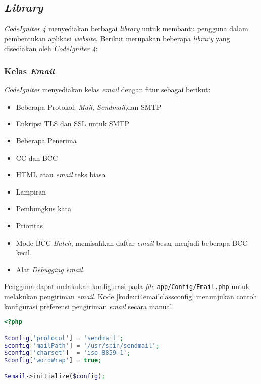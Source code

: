 \subsection{\textit{Library}}
\textit{CodeIgniter 4} menyediakan berbagai \textit{library} untuk membantu pengguna dalam pembentukan aplikasi \textit{website}. Berikut merupakan beberapa \textit{library} yang disediakan oleh \textit{CodeIgniter 4}:
\subsubsection{Kelas \textit{Email}}
\textit{CodeIgniter} menyediakan kelas \textit{email} dengan fitur sebagai berikut:
\begin{itemize}
\item Beberapa Protokol: \textit{Mail, Sendmail},dan SMTP
\item Enkripsi TLS dan SSL untuk SMTP
\item Beberapa Penerima
\item CC dan BCC
\item HTML atau \textit{email} teks biasa
\item Lampiran
\item Pembungkus kata
\item Prioritas
\item Mode BCC \textit{Batch}, memisahkan daftar \textit{email} besar menjadi beberapa BCC kecil.
\item Alat \textit{Debugging email}
\end{itemize}

Pengguna dapat melakukan konfigurasi pada \textit{file} \verb|app/Config/Email.php| untuk melakukan pengiriman \textit{email}. Kode \ref{kode:ci4emailclassconfig} menunjukan contoh konfigurasi preferensi pengiriman \textit{email} secara manual.
 \begin{lstlisting}[language=PHP, caption=Contoh kode untuk melakukan konfigurasi \textit{email}. ,label=kode:ci4emailclassconfig]
<?php

$config['protocol'] = 'sendmail';
$config['mailPath'] = '/usr/sbin/sendmail';
$config['charset']  = 'iso-8859-1';
$config['wordWrap'] = true;

$email->initialize($config);
\end{lstlisting}

